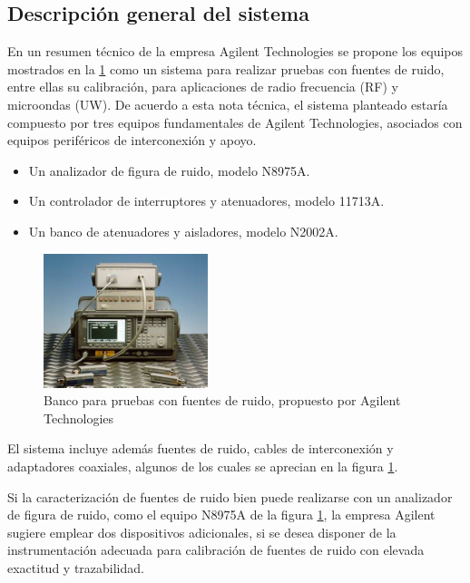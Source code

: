 \documentclass{article}
\begin{document}
	\subsection{Descripción general del sistema}
	En un resumen técnico de la empresa Agilent Technologies \cite{AGI01} se propone los equipos mostrados en la \ref{Fig:BancoPruebasFuenteRuido} como un sistema para realizar pruebas con fuentes de ruido, entre ellas su calibración, para aplicaciones de radio frecuencia
	(RF) y microondas (UW). De acuerdo a esta nota técnica, el sistema planteado estaría compuesto por tres equipos
	fundamentales de Agilent Technologies, asociados con equipos periféricos de interconexión y apoyo.
	
	\begin{itemize}
		\item Un analizador de figura de ruido, modelo N8975A.
		\item Un controlador de interruptores y atenuadores, modelo 11713A.
		\item Un banco de atenuadores y aisladores, modelo N2002A.
	\end{itemize}	

	\begin{figure}[h!]
		\begin{minipage}{16.009cm}					
			\centering
			\includegraphics{Imagenes/BancoPruebasFuenteRuido.png}
			\caption{Banco para pruebas con fuentes de ruido, propuesto por Agilent Technologies}
			\label{Fig:BancoPruebasFuenteRuido}
		\end{minipage}
	\end{figure}

	El sistema incluye además fuentes de ruido, cables de interconexión y adaptadores coaxiales, algunos de los cuales se aprecian en la figura \ref{Fig:BancoPruebasFuenteRuido}.
	
	Si la caracterización de fuentes de ruido bien puede realizarse con un analizador de figura de ruido, como el equipo N8975A de la figura \ref{Fig:BancoPruebasFuenteRuido}, la empresa Agilent sugiere emplear dos dispositivos adicionales, si se desea disponer de la instrumentación adecuada para calibración de fuentes de ruido con elevada exactitud y trazabilidad. 
	
\end{document}
